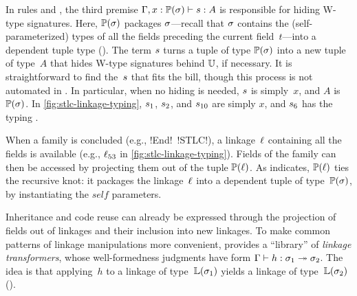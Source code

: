 In rules  and ,
the third premise $ {\Gamma,x : \mathbb{P}({\sigma})} \vdash {\ensuremath{s}} : {A} $ is
responsible for hiding W-type signatures.
Here, $\mathbb{P}({\sigma})$ packages $\sigma$---recall that $\sigma$ contains the
(self-parameterized) types of all the fields preceding the current
field~$t$---into a dependent tuple type ().
The term $s$ turns a tuple of type $\mathbb{P}({\sigma})$ into a new tuple of type~$A$
that hides W-type signatures behind $\mathbb{U}$, if necessary.
%
It is straightforward to find the~$s$ that fits the bill, though this process
is not automated in \TT.
In particular, when no hiding is needed, $s$ is simply~$x$,
and $A$ is $\mathbb{P}({\sigma})$.
In \cref{fig:stlc-linkage-typing}, $s_1$, $s_2$, and $s_{10}$ are simply $x$,
and $s_6$ has the typing
\begingroup
\fontsize{9}{9}\selectfont%
.
\endgroup

When a family is concluded (e.g., \lsti!End!~\lsti!STLC!),
a linkage~$\ell$ containing all the fields is available
(e.g., $\ell_{53}$ in \cref{fig:stlc-linkage-typing}).
Fields of the family can then be accessed by projecting them out of the tuple
$\mathbb{P}({\ell})$.
As  indicates, $\mathbb{P}({\ell})$ ties the recursive knot:
it packages the linkage~$\ell$ into a dependent tuple of type~$\mathbb{P}({\sigma})$,
by instantiating the $\mathit{self}$ parameters.



Inheritance and code reuse can already be expressed through the projection
of fields out of linkages and their inclusion into new linkages.
To make common patterns of linkage manipulations more convenient,
\TT provides a ``library'' of \emph{linkage transformers}, whose well-formedness judgments
have form $ {\Gamma} \vdash {h} : {\sigma_1} \twoheadrightarrow {\ensuremath{\sigma}_2}$. The idea is that
applying~$h$ to a linkage of type~$\mathbb{L}({\sigma_1})$ yields a linkage of
type~$\mathbb{L}({\sigma_2})$ ().

